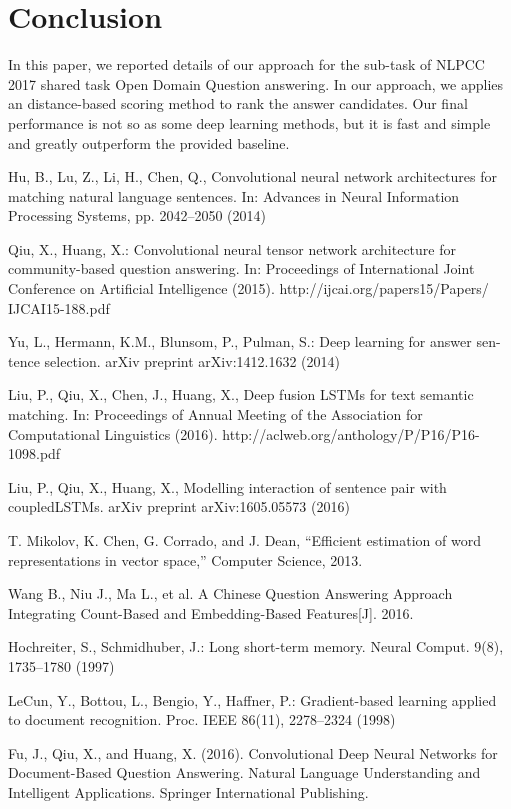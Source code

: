 \documentclass{llncs}
\begin{document}
\section{Conclusion}

In this paper, we reported details of our approach for the sub-task of
NLPCC 2017 shared task Open Domain Question answering. In our approach,
we applies an distance-based scoring method to rank the answer candidates. Our 
final performance is not so as some deep learning methods, but it is 
fast and simple and greatly outperform the provided baseline. 

%
%
\begin{thebibliography}{5}

Hu, B., Lu, Z., Li, H., Chen, Q.,
Convolutional neural network architectures for matching natural language sentences. 
In: Advances in Neural Information Processing Systems, pp. 2042–2050 (2014)

Qiu, X., Huang, X.: Convolutional neural tensor network architecture for
community-based question answering. In: Proceedings of International Joint
Conference on Artificial Intelligence (2015). http://ijcai.org/papers15/Papers/
IJCAI15-188.pdf

Yu, L., Hermann, K.M., Blunsom, P., Pulman, S.: Deep learning for answer sen-
tence selection. arXiv preprint arXiv:1412.1632 (2014)

Liu, P., Qiu, X., Chen, J., Huang, X., 
Deep fusion LSTMs for text semantic matching. 
In: Proceedings of Annual Meeting of the Association for Computational Linguistics (2016). http://aclweb.org/anthology/P/P16/P16-1098.pdf

Liu, P., Qiu, X., Huang, X.,
Modelling interaction of sentence pair with coupledLSTMs. arXiv preprint arXiv:1605.05573 (2016)

T. Mikolov, K. Chen, G. Corrado, and J. Dean, “Efficient estimation of word
representations in vector space,” Computer Science, 2013.

Wang B., Niu J., Ma L., et al. A Chinese Question Answering Approach Integrating Count-Based and Embedding-Based Features[J]. 2016.

Hochreiter, S., Schmidhuber, J.: Long short-term memory. Neural Comput. 9(8),
1735–1780 (1997)

LeCun, Y., Bottou, L., Bengio, Y., Haffner, P.: Gradient-based learning applied to
document recognition. Proc. IEEE 86(11), 2278–2324 (1998)

Fu, J., Qiu, X., and Huang, X. (2016). Convolutional Deep Neural Networks for Document-Based Question Answering. Natural Language Understanding and Intelligent Applications. Springer International Publishing.


\end{thebibliography}
\end{document}
